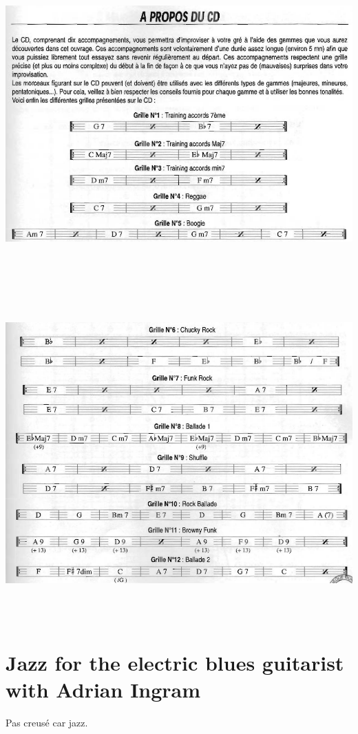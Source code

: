 \documentclass[a4paper]{book}
\begin{document}
\begin{center}
\includegraphics[width=17cm,height=11.555cm]{lebluessupportsmethodes-img107.png}
\end{center}


\begin{center}
\includegraphics[width=17cm,height=12.771cm]{lebluessupportsmethodes-img108.png}
\end{center}
\clearpage\section[Jazz for the electric blues guitarist with Adrian
Ingram]{Jazz for the electric blues guitarist with Adrian Ingram}
\hypertarget{RefHeadingToc164973218262}{}Pas creus\'e car jazz.
\end{document}
